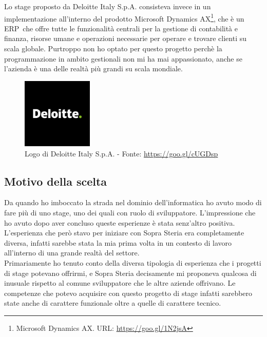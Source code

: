Lo stage proposto da Deloitte Italy S.p.A. consisteva invece in un implementazione all'interno del prodotto Microsoft Dynamics AX\footnote{Microsoft Dynamics AX. URL: \url{https://goo.gl/1N2jsA}}, che è un ERP\glossario\ che offre tutte le funzionalità centrali per la gestione di contabilità e finanza, risorse umane e operazioni necessarie per operare e trovare clienti su scala globale. Purtroppo non ho optato per questo progetto perchè la programmazione in ambito gestionali non mi ha mai appassionato, anche se l'azienda è una delle realtà più grandi su scala mondiale.\\
	\begin{figure}[H]
		\centering
	   	\includegraphics[width=0.3\textwidth]{immagini/deloitte}
	   	\caption{Logo di Deloitte Italy S.p.A. - Fonte: \url{https://goo.gl/cUGDsp}}
	\end{figure}

\subsection{Motivo della scelta}

Da quando ho imboccato la strada nel dominio dell'informatica ho avuto modo di fare più di uno stage, uno dei quali con ruolo di sviluppatore. L'impressione che ho avuto dopo aver concluso queste esperienze è stata senz'altro positiva. L'esperienza che però stavo per iniziare con Sopra Steria era completamente diversa, infatti sarebbe stata la mia prima volta in un contesto di lavoro all'interno di una grande realtà del settore.\\

Primariamente ho tenuto conto della diversa tipologia di esperienza che i progetti di stage potevano offrirmi, e Sopra Steria decisamente mi proponeva qualcosa di inusuale rispetto al comune sviluppatore che le altre aziende offrivano. Le competenze che potevo acquisire con questo progetto di stage infatti sarebbero state anche di carattere funzionale oltre a quelle di carattere tecnico.\\

